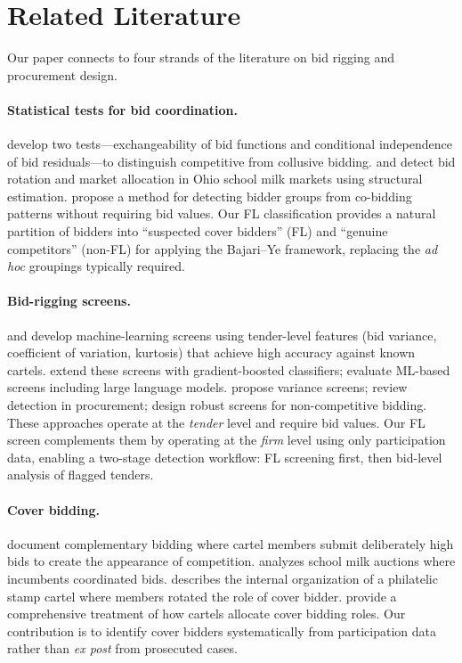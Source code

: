 \section{Related Literature}
\label{sec:literature}

Our paper connects to four strands of the literature on bid rigging and
procurement design.

\paragraph{Statistical tests for bid coordination.}
\citet{bajari2003deciding} develop two tests---exchangeability of bid
functions and conditional independence of bid residuals---to distinguish
competitive from collusive bidding. \citet{porter1993detection} and
\citet{porter1999ohio} detect bid rotation and market allocation in Ohio
school milk markets using structural estimation.
\citet{conley2016detecting} propose a method for detecting bidder groups
from co-bidding patterns without requiring bid values. Our FL
classification provides a natural partition of bidders into ``suspected
cover bidders'' (FL) and ``genuine competitors'' (non-FL) for applying
the Bajari--Ye framework, replacing the \emph{ad hoc} groupings
typically required.

\paragraph{Bid-rigging screens.}
\citet{imhof2019detecting} and \citet{imhof2018screening} develop %
machine-learning screens using tender-level features (bid variance,
coefficient of variation, kurtosis) that achieve high accuracy against
known cartels. \citet{huber2019machine} extend these screens with
gradient-boosted classifiers; \citet{wallimann2023wild} evaluate
ML-based screens including large language models.
\citet{abrantesmetz2006a} propose variance screens;
\citet{hüschelrath2014cartel} review detection in procurement;
\citet{chassang2022robust} design robust screens for non-competitive
bidding. These approaches operate at the \emph{tender} level and require
bid values. Our FL screen complements them by operating at the
\emph{firm} level using only participation data, enabling a two-stage
detection workflow: FL screening first, then bid-level analysis of
flagged tenders.

\paragraph{Cover bidding.}
\citet{porter1999ohio} document complementary bidding where cartel
members submit deliberately high bids to create the appearance of
competition. \citet{pesendorfer2000study} analyzes school milk auctions
where incumbents coordinated bids. \citet{asker2010leniency} describes
the internal organization of a philatelic stamp cartel where members
rotated the role of cover bidder. \citet{marshall2012economics} provide a
comprehensive treatment of how cartels allocate cover bidding roles. Our
contribution is to identify cover bidders systematically from
participation data rather than \emph{ex post} from prosecuted cases.

